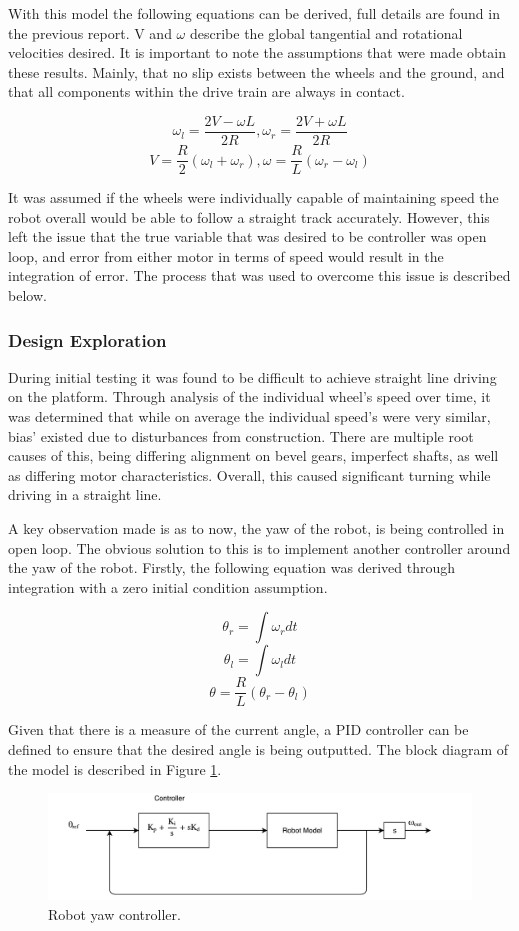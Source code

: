 \documentclass[ece]{uw-wkrpt}
\begin{document}
With this model the following equations can be derived, full details are found in the previous report. V and $\omega$ describe the global tangential and rotational velocities desired. It is important to note the assumptions that were made obtain these results. Mainly, that no slip exists between the wheels and the ground, and that all components within the drive train are always in contact.

\[\omega_l = \frac{2V-\omega L}{2R},\omega_r = \frac{2V+\omega L}{2R}\]
\[V=\frac{R}{2}(\omega_l+\omega_r),  \omega=\frac{R}{L}(\omega_r-\omega_l)\]

It was assumed if the wheels were individually capable of maintaining speed the robot overall would be able to follow a straight track accurately. However, this left the issue that the true variable that was desired to be controller was open loop, and error from either motor in terms of speed would result in the integration of error. The process that was used to overcome this issue is described below.

\subsubsection{Design Exploration}

During initial testing it was found to be difficult to achieve straight line driving on the platform. Through analysis of the individual wheel's speed over time, it was determined that while on average the individual speed's were very similar, bias' existed due to disturbances from construction. There are multiple root causes of this, being differing alignment on bevel gears, imperfect shafts, as well as differing motor characteristics. Overall, this caused significant turning while driving in a straight line.

A key observation made is as to now, the yaw of the robot, is being controlled in open loop. The obvious solution to this is to implement another controller around the yaw of the robot. Firstly, the following equation was derived through integration with a zero initial condition assumption.

\[\theta_r = \int\omega_rdt\]
\[\theta_l = \int\omega_ldt\]
\[\theta=\frac{R}{L}(\theta_r-\theta_l)\]

Given that there is a measure of the current angle, a PID controller can be defined to ensure that the desired angle is being outputted. The block diagram of the model is described in Figure \ref{fig:yawController}.

\begin{figure}
    \centering
    \includegraphics[width=5.5in]{res/yawController}
    \caption[Robot yaw controller]
          {Robot yaw controller.}
    \label{fig:yawController}
\end{figure}
\end{document}
